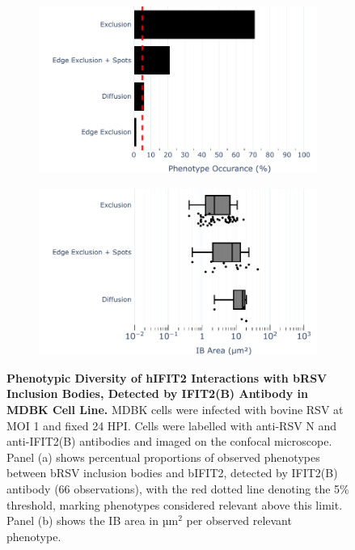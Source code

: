 \begin{figure}
    \begin{subfigure}{0.495\textwidth}
        \caption{}
        \includegraphics[width=1\linewidth]{08. Chapter 3/Figs/02. Infection/02. IFIT2/02. IFIT2B/10. bar_i2b_mdbk.pdf} 
    \end{subfigure}
    \begin{subfigure}{0.495\textwidth}
        \caption{}
        \includegraphics[width=1\linewidth]{08. Chapter 3/Figs/02. Infection/02. IFIT2/02. IFIT2B/11. box_i2b_mdbk.pdf}
    \end{subfigure}
    \caption[Phenotypic Diversity of hIFIT2 Interactions with bRSV Inclusion Bodies, Detected by IFIT2(B) Antibody in MDBK Cell Line.]{\textbf{Phenotypic Diversity of hIFIT2 Interactions with bRSV Inclusion Bodies, Detected by IFIT2(B) Antibody in MDBK Cell Line.} MDBK cells were infected with bovine RSV at MOI 1 and fixed 24 HPI. Cells were labelled with anti-RSV N and anti-IFIT2(B) antibodies and imaged on the confocal microscope. Panel (a) shows percentual proportions of observed phenotypes between bRSV inclusion bodies and bIFIT2, detected by IFIT2(B) antibody (66 observations), with the red dotted line denoting the 5\% threshold, marking phenotypes considered relevant above this limit. Panel (b) shows the IB area in \(\mbox{µm}^2\) per observed relevant phenotype.}
    \label{fig:Phenotypic Diversity of hIFIT2 Interactions with bRSV Inclusion Bodies, Detected by IFIT2(B) Antibody in MDBK Cell Line}
\end{figure}


